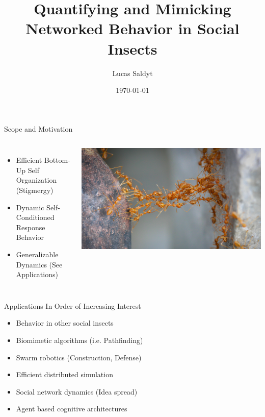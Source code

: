 \documentclass{beamer}
\title{Quantifying and Mimicking Networked Behavior in Social Insects}
\date{\today}
\author{Lucas Saldyt}
\institute{Arizona State University}
\begin{document}
  \maketitle
  \begin{frame}{Scope and Motivation}
      \begin{columns}
      \begin{itemize}
          \item Efficient Bottom-Up Self Organization (Stigmergy)
          \item Dynamic Self-Conditioned Response Behavior
          \item Generalizable Dynamics \tiny (See Applications)
      \end{itemize}
      \includegraphics[scale=0.5]{ants2}
      \end{columns}
  \end{frame}

  \begin{frame}{Applications In Order of Increasing Interest}
      \begin{itemize}
          \item Behavior in other social insects
          \item Biomimetic algorithms (i.e. Pathfinding)
          \item Swarm robotics (Construction, Defense)
          \item Efficient distributed simulation
          \item Social network dynamics (Idea spread)
          \item Agent based cognitive architectures
      \end{itemize}
  \end{frame}
\end{document}
